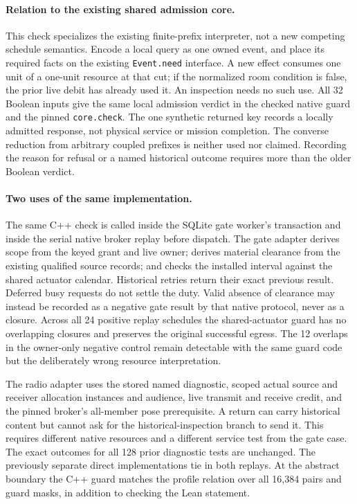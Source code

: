 \documentclass{article}
\begin{document}
\paragraph{Relation to the existing shared admission core.}
This check specializes the existing finite-prefix interpreter, not
a new competing schedule semantics. Encode a local query as one
owned event, and place its required facts on the existing
\texttt{Event.need} interface. A new effect consumes one unit of a
one-unit resource at that cut; if the normalized room condition is
false, the prior live debit has already used it. An inspection needs
no such use. All 32 Boolean inputs give the same local admission
verdict in the checked native guard and the pinned
\texttt{core.check}. The one synthetic returned key records a locally
admitted response, not physical service or mission completion.
The converse reduction from arbitrary coupled prefixes is neither
used nor claimed. Recording the reason for refusal or a named
historical outcome requires more than the older Boolean verdict.

\paragraph{Two uses of the same implementation.}
The same C++ check is called inside the SQLite gate worker's
transaction and inside the serial native broker replay before
dispatch. The gate adapter derives scope from the keyed grant
and live owner; derives material clearance from the existing
qualified source records; and checks the installed interval
against the shared actuator calendar. Historical retries return
their exact previous result. Deferred busy requests do not settle
the duty. Valid absence of clearance may instead be recorded as a
negative gate result by that native protocol, never as a closure.
Across all 24 positive replay schedules the shared-actuator guard
has no overlapping closures and preserves the original successful
egress. The 12 overlaps in the owner-only negative control remain
detectable with the same guard code but the deliberately wrong
resource interpretation.

The radio adapter uses the stored named diagnostic, scoped actual
source and receiver allocation instances and audience, live
transmit and receive credit, and the pinned broker's all-member
pose prerequisite. A return can carry historical content but
cannot ask for the historical-inspection branch to send it. This
requires different native resources and a different service
test from the gate case. The exact outcomes for all 128 prior
diagnostic tests are unchanged. The previously separate direct
implementations tie in both replays. At the abstract boundary the
C++ guard matches the profile relation over all 16{,}384 pairs and
guard masks, in addition to checking the Lean statement.
\end{document}
